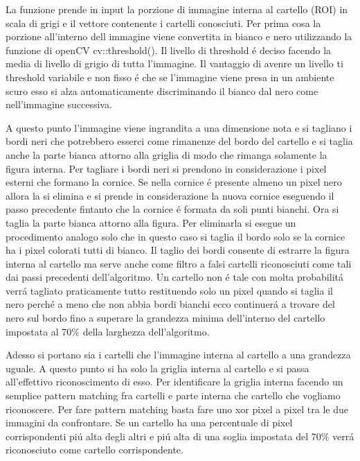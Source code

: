 		La funzione prende in input la porzione di immagine interna al cartello (ROI) in scala di grigi e il vettore contenente i cartelli conosciuti. Per prima cosa la porzione all'interno dell immagine viene convertita in bianco e nero utilizzando la funzione di openCV cv::threshold(). Il livello di threshold \'e deciso facendo la media di livello di grigio di tutta l'immagine. Il vantaggio di avenre un livello ti threshold variabile e non fisso \'e che se l'immagine viene presa in un ambiente scuro esso si alza automaticamente discriminando il bianco dal nero come nell'immagine successiva.
		
		A questo punto l'immagine viene ingrandita a una dimensione nota e si tagliano i bordi neri che potrebbero esserci come rimanenze del bordo del cartello e si taglia anche la parte bianca attorno alla griglia di modo che rimanga solamente la figura interna. Per tagliare i bordi neri si prendono in considerazione i pixel esterni che formano la cornice. Se nella cornice \'e presente almeno un pixel nero allora la si elimina e si prende in considerazione la nuova cornice eseguendo il passo precedente fintanto che la cornice \'e formata da soli punti bianchi. Ora si taglia la parte bianca attorno alla figura. Per eliminarla si esegue un procedimento analogo solo che in questo caso si taglia il bordo solo se la cornice ha i pixel colorati tutti di bianco. Il taglio dei bordi consente di estrarre la figura interna al cartello ma serve anche come filtro a falsi cartelli riconosciuti come tali dai passi precedenti dell'algoritmo. Un cartello non \'e tale con molta probabilit\'a verr\'a tagliato praticamente tutto restituendo solo un pixel quando si taglia il nero perch\'e a meno che non abbia bordi bianchi ecco continuer\'a a trovare del nero sul bordo fino a superare la grandezza minima dell'interno del cartello impostata al 70\% della larghezza dell'algoritmo.
		
		Adesso si portano sia i cartelli che l'immagine interna al cartello a una grandezza uguale. A questo punto si ha solo la griglia interna al cartello e si passa all'effettivo riconoscimento di esso. Per identificare la griglia interna facendo un semplice pattern matching fra cartelli e parte interna che cartello che vogliamo riconoscere. Per fare pattern matching basta fare uno xor pixel a pixel tra le due immagini da confrontare. Se un cartello ha una percentuale di pixel corrispondenti pi\'u alta degli altri e pi\'u alta di una soglia impostata del 70\% verr\'a riconosciuto come cartello corrispondente.
		

